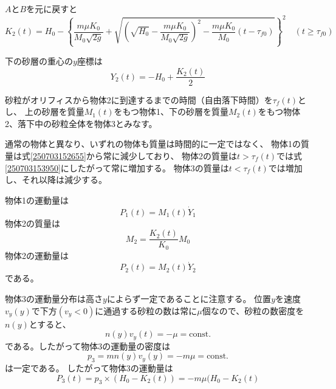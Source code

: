 \documentclass[]{article}
\begin{document}
$A$と$B$を元に戻すと 
\begin{equation} \label{250917184334} 
   K_2(t) =  H_0 - \left\{
   				\frac{m \mu K_0}{M_0\sqrt{2g}} + \sqrt{\left(\sqrt{H_0}-\frac{m \mu K_0}{M_0\sqrt{2g}}\right)^2-\frac{m \mu K_0}{M_0}(t-\tau_{f0})}
   				\right\}^2  \quad (t\ge \tau_{f0})
\end{equation}

\color{black}

下の砂層の重心の$y$座標は
\begin{equation} \label{250703154424} 
   Y_2(t) = -H_0 + \frac{K_2(t)}{2} 
\end{equation}



砂粒がオリフィスから物体2に到達するまでの時間（自由落下時間）を$\tau_f(t)$とし、
上の砂層を質量$M_1(t)$をもつ物体1、下の砂層を質量$M_2(t)$をもつ物体2、落下中の砂粒全体を物体3とみなす。


通常の物体と異なり、いずれの物体も質量は時間的に一定ではなく、
物体1の質量は式\eqref{250703152655}から常に減少しており、
物体2の質量は$t>\tau_f(t)$では式\eqref{250703153950}にしたがって常に増加する。
物体3の質量は$t<\tau_f(t)$では増加し、それ以降は減少する。


物体1の運動量は
\begin{equation} \label{250917102959} 
   P_1(t)  = M_1(t) \dot{Y}_1 
\end{equation}
物体2の質量は
\begin{equation} \label{250917184641} 
   M_2 = \frac{K_2(t)}{K_0} M_0
\end{equation}
物体2の運動量は
\begin{equation} \label{250917103019} 
   P_2(t) = M_2(t)\dot{Y}_2  
\end{equation}
である。


物体3の運動量分布は高さ$y$によらず一定であることに注意する。
位置$y$を速度$v_y(y)$で下方$(v_y<0)$に通過する砂粒の数は常に$\mu$個なので、砂粒の数密度を$n(y)$とすると、
\begin{equation} \label{250917101402} 
   n(y) v_y(t) = -\mu = \text{const.}
\end{equation}
である。したがって物体3の運動量の密度は
\begin{equation} \label{250917102631} 
   p_3 = mn(y)v_y(y)= -m \mu = \text{const.}
\end{equation}
は一定である。
したがって物体3の運動量は
\begin{equation} \label{250917102719} 
   P_3(t) = p_3 \times (H_0 - K_2(t)) = -m\mu(H_0-K_2(t)
\end{equation}
\end{document}
